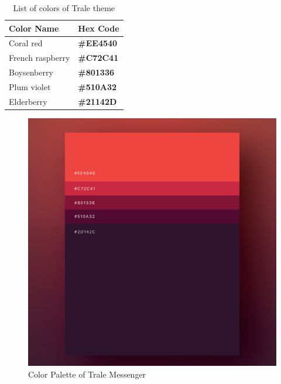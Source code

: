 \begin{table}[hb]
    \centering
    \begin{tabular}{|l|l|}
        \hline
        \textbf{Color Name} & \textbf{Hex Code}                     \\ \hline
        Coral red           & \color[HTML]{EE4540}\textbf{\#EE4540} \\ \hline
        French raspberry    & \color[HTML]{C72C41}\textbf{\#C72C41} \\ \hline
        Boysenberry         & \color[HTML]{801336}\textbf{\#801336} \\ \hline
        Plum violet         & \color[HTML]{510A32}\textbf{\#510A32} \\ \hline
        Elderberry          & \color[HTML]{21142D}\textbf{\#21142D} \\ \hline
    \end{tabular}
    \caption{List of colors of Trale theme}
    \label{tab:colorTable}
\end{table}

\begin{figure}
    \centering
    \includegraphics[width=1.0\textwidth]{./images/colorPalette}
    \caption{Color Palette of Trale Messenger}
    \label{fig:colorPalette}
\end{figure}

